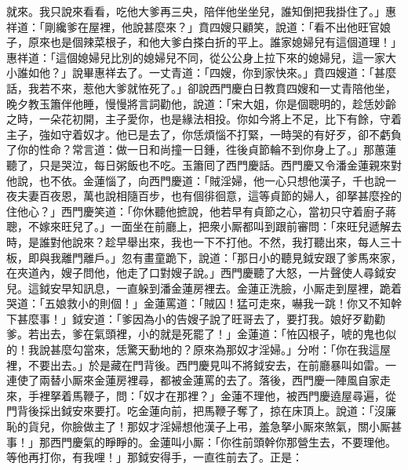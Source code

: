 就來。我只說來看看，吃他大爹再三央，陪伴他坐坐兒，誰知倒把我掛住了。」惠祥道：「剛纔爹在屋裡，他說甚麼來？」賁四嫂只顧笑，說道：「看不出他旺官娘子，原來也是個辣菜根子，{}和他大爹白搽白折的平上。誰家媳婦兒有這個道理！」惠祥道：「這個媳婦兒比別的媳婦兒不同，從公公身上拉下來的媳婦兒，{}這一家大小誰如他？」說畢惠祥去了。一丈青道：「四嫂，你到家快來。」賁四嫂道：「甚麼話，我若不來，惹他大爹就恠死了。」卻說西門慶白日教賁四嫂和一丈青陪他坐，晚夕教玉簫伴他睡，慢慢將言詞勸他，說道：「宋大姐，你是個聰明的，趁恁妙齡之時，一朵花初開，主子愛你，也是緣法相投。你如今將上不足，比下有餘，守着主子，強如守着奴才。他已是去了，你恁煩惱不打緊，一時哭的有好歹，卻不虧負了你的性命？常言道：做一日和尚撞一日鍾，徃後貞節輪不到你身上了。」{}那蕙蓮聽了，只是哭泣，每日粥飯也不吃。{}玉簫囘了西門慶話。西門慶又令潘金蓮親來對他說，也不依。金蓮惱了，向西門慶道：「賊淫婦，他一心只想他漢子，千也說一夜夫妻百夜恩，萬也說相隨百步，也有個徘徊意，這等貞節的婦人，卻拏甚麼拴的住他心？」西門慶笑道：「你休聽他摭說，他若早有貞節之心，當初只守着廚子蔣聰，不嫁來旺兒了。」{}一面坐在前廳上，把衆小厮都叫到跟前審問：「來旺兒遞解去時，是誰對他說來？趁早舉出來，我也一下不打他。不然，我打聽出來，每人三十板，即與我離門離戶。」忽有畫童跪下，說道：「那日小的聽見鉞安跟了爹馬來家，在夾道內，嫂子問他，他走了口對嫂子說。」西門慶聽了大怒，一片聲使人尋鉞安兒。這鉞安早知訊息，一直躲到潘金蓮房裡去。金蓮正洗臉，小厮走到屋裡，跪着哭道：「五娘救小的則個！」金蓮罵道：「賊囚！猛可走來，嚇我一跳！你又不知幹下甚麼事！」鉞安道：「爹因為小的告嫂子說了旺哥去了，要打我。娘好歹勸勸爹。若出去，爹在氣頭裡，小的就是死罷了！」金蓮道：「恠囚根子，唬的鬼也似的！我說甚麼勾當來，恁驚天動地的？原來為那奴才淫婦。」分咐：「你在我這屋裡，不要出去。」於是藏在門背後。西門慶見叫不將鉞安去，在前廳暴叫如雷。一連使了兩替小厮來金蓮房裡尋，都被金蓮罵的去了。落後，西門慶一陣風自家走來，手裡拏着馬鞭子，問：「奴才在那裡？」金蓮不理他，被西門慶遶屋尋遍，從門背後採出鉞安來要打。吃金蓮向前，把馬鞭子奪了，掠在床頂上。{}說道：「沒廉恥的貨兒，你臉做主了！那奴才淫婦想他漢子上弔，羞急拏小厮來煞氣，關小厮甚事！」那西門慶氣的睜睜的。{}金蓮叫小厮：「你徃前頭幹你那營生去，不要理他。等他再打你，有我哩！」那鉞安得手，一直徃前去了。正是：

